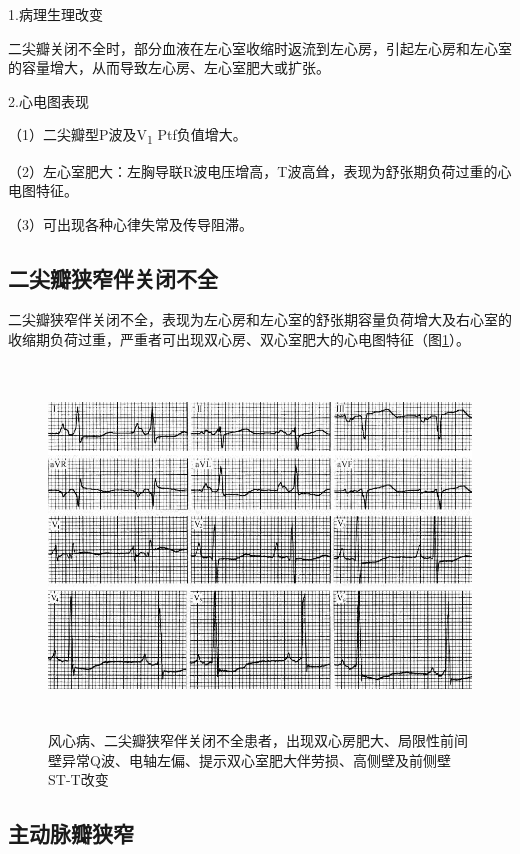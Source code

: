 1.病理生理改变

二尖瓣关闭不全时，部分血液在左心室收缩时返流到左心房，引起左心房和左心室的容量增大，从而导致左心房、左心室肥大或扩张。

2.心电图表现

（1）二尖瓣型P波及V\textsubscript{1} Ptf负值增大。

（2）左心室肥大：左胸导联R波电压增高，T波高耸，表现为舒张期负荷过重的心电图特征。

（3）可出现各种心律失常及传导阻滞。

\protect\hypertarget{text00050.htmlux5cux23subid602}{}{}

\subsection{二尖瓣狭窄伴关闭不全}

二尖瓣狭窄伴关闭不全，表现为左心房和左心室的舒张期容量负荷增大及右心室的收缩期负荷过重，严重者可出现双心房、双心室肥大的心电图特征（图\ref{fig42-8}）。

\begin{figure}[!htbp]
 \centering
 \includegraphics[width=5.58333in,height=3.78125in]{./images/Image00699.jpg}
 \captionsetup{justification=centering}
 \caption{风心病、二尖瓣狭窄伴关闭不全患者，出现双心房肥大、局限性前间壁异常Q波、电轴左偏、提示双心室肥大伴劳损、高侧壁及前侧壁ST-T改变}
 \label{fig42-8}
  \end{figure} 

\protect\hypertarget{text00050.htmlux5cux23subid603}{}{}

\subsection{主动脉瓣狭窄}

